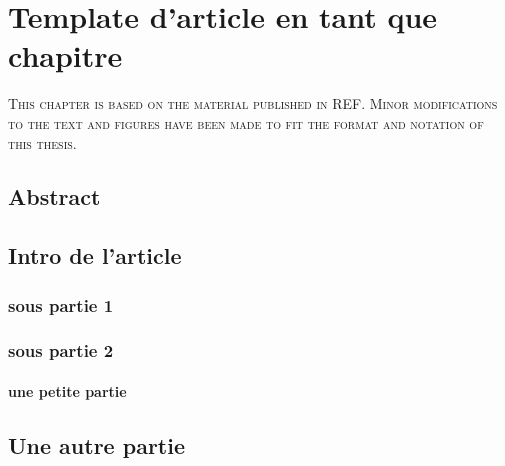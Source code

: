 \chapter{Template d'article en tant que chapitre}

\begin{center}
    {\color{gray}\textsc{This chapter is based on the material published in REF. Minor modifications to the text and figures have been made to fit the format and notation of this thesis.}}
\end{center}

\section{Abstract}

\newpage
\section{Intro de l'article}
\subsection{sous partie 1}
\subsection{sous partie 2}
\subsubsection{une petite partie}
\section{Une autre partie}